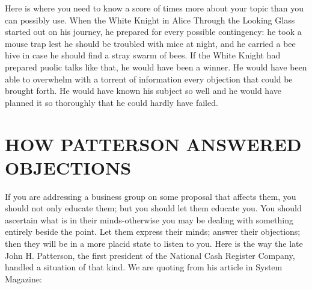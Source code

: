 \documentclass[10pt]{article}
\begin{document}
Here is where you need to know a score of times more about your topic than you can possibly use. When the White Knight in Alice Through the Looking Glass started out on his journey, he prepared for every possible contingency: he took a mouse trap lest he should be troubled with mice at night, and he carried a bee hive in case he should find a stray swarm of bees. If the White Knight had prepared puolic talks like that, he would have been a winner. He would have been able to overwhelm with a torrent of information every objection that could be brought forth. He would have known his subject so well and he would have planned it so thoroughly that he could hardly have failed.

\section*{HOW PATTERSON ANSWERED OBJECTIONS}
If you are addressing a business group on some proposal that affects them, you should not only educate them; but you should let them educate you. You should ascertain what is in their minds-otherwise you may be dealing with something entirely beside the point. Let them express their minds; answer their objections; then they will be in a more placid state to listen to you. Here is the way the late John H. Patterson, the first president of the National Cash Register Company, handled a situation of that kind. We are quoting from his article in System Magazine:
\end{document}
